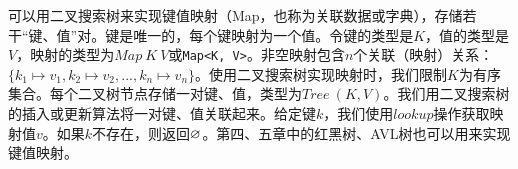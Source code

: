 \documentclass[b5paper]{ctexart}
\begin{document}
可以用二叉搜索树来实现键值映射（Map，也称为关联数据或字典），存储若干“键、值”对。键是唯一的，每个键映射为一个值。令键的类型是$K$，值的类型是$V$，映射的类型为$Map\ K\ V$或\texttt{Map<K, V>}。非空映射包含$n$个关联（映射）关系：$\{k_1 \mapsto v_1, k_2 \mapsto v_2, ..., k_n \mapsto v_n\}$。使用二叉搜索树实现映射时，我们限制$K$为有序集合。每个二叉树节点存储一对键、值，类型为$Tree\ (K, V)$。我们用二叉搜索树的插入或更新算法将一对键、值关联起来。给定键$k$，我们使用$lookup$操作获取映射值$v$。如果$k$不存在，则返回$\varnothing$。第四、五章中的红黑树、AVL树也可以用来实现键值映射。

\begin{Exercise}\label{ex:bst-delete}
\end{Exercise}
\end{document}
